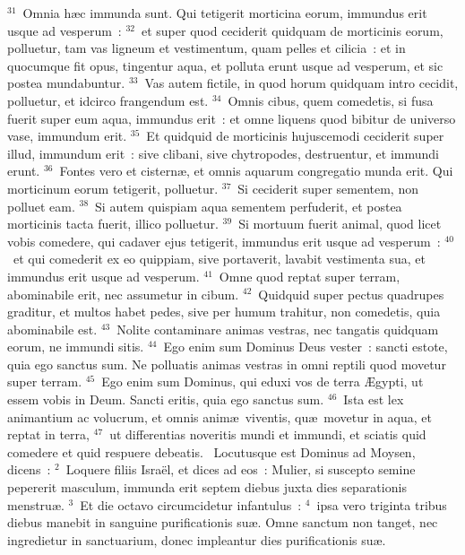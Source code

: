 ${}^{31}$~Omnia h\ae c immunda sunt. Qui tetigerit morticina eorum, immundus erit usque ad vesperum~:
${}^{32}$~et super quod ceciderit quidquam de morticinis eorum, polluetur, tam vas ligneum et vestimentum, quam pelles et cilicia~: et in quocumque fit opus, tingentur aqua, et polluta erunt usque ad vesperum, et sic postea mundabuntur.
${}^{33}$~Vas autem fictile, in quod horum quidquam intro cecidit, polluetur, et idcirco frangendum est.
${}^{34}$~Omnis cibus, quem comedetis, si fusa fuerit super eum aqua, immundus erit~: et omne liquens quod bibitur de universo vase, immundum erit.
${}^{35}$~Et quidquid de morticinis hujuscemodi ceciderit super illud, immundum erit~: sive clibani, sive chytropodes, destruentur, et immundi erunt.
${}^{36}$~Fontes vero et cistern\ae , et omnis aquarum congregatio munda erit. Qui morticinum eorum tetigerit, polluetur.
${}^{37}$~Si ceciderit super sementem, non polluet eam.
${}^{38}$~Si autem quispiam aqua sementem perfuderit, et postea morticinis tacta fuerit, illico polluetur.
${}^{39}$~Si mortuum fuerit animal, quod licet vobis comedere, qui cadaver ejus tetigerit, immundus erit usque ad vesperum~:
${}^{40}$~et qui comederit ex eo quippiam, sive portaverit, lavabit vestimenta sua, et immundus erit usque ad vesperum.
${}^{41}$~Omne quod reptat super terram, abominabile erit, nec assumetur in cibum.
${}^{42}$~Quidquid super pectus quadrupes graditur, et multos habet pedes, sive per humum trahitur, non comedetis, quia abominabile est.
${}^{43}$~Nolite contaminare animas vestras, nec tangatis quidquam eorum, ne immundi sitis.
${}^{44}$~Ego enim sum Dominus Deus vester~: sancti estote, quia ego sanctus sum. Ne polluatis animas vestras in omni reptili quod movetur super terram.
${}^{45}$~Ego enim sum Dominus, qui eduxi vos de terra \AE gypti, ut essem vobis in Deum. Sancti eritis, quia ego sanctus sum.
${}^{46}$~Ista est lex animantium ac volucrum, et omnis anim\ae\ viventis, qu\ae\ movetur in aqua, et reptat in terra,
${}^{47}$~ut differentias noveritis mundi et immundi, et sciatis quid comedere et quid respuere debeatis.
~\lettrine[lines=10,image=true,loversize=0.05,lraise=-0.03]{L}{}ocutusque est Dominus ad Moysen, dicens~:
${}^{2}$~Loquere filiis Isra\"el, et dices ad eos~: Mulier, si suscepto semine pepererit masculum, immunda erit septem diebus juxta dies separationis menstru\ae .
${}^{3}$~Et die octavo circumcidetur infantulus~:
${}^{4}$~ipsa vero triginta tribus diebus manebit in sanguine purificationis su\ae . Omne sanctum non tanget, nec ingredietur in sanctuarium, donec impleantur dies purificationis su\ae .

